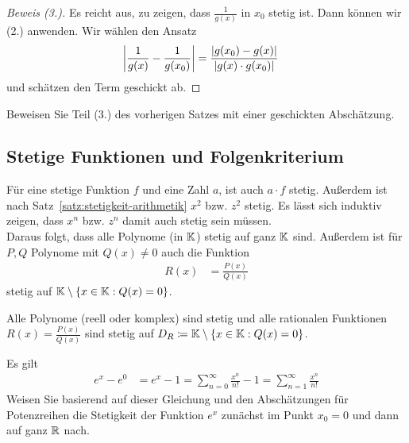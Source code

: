 \begin{satz}
    \begin{proof}[Beweis (3.)]
        Es reicht aus, zu zeigen, dass $\frac{1}{g(x)}$ in $x_0$ stetig ist. Dann können wir (2.) anwenden. Wir wählen den Ansatz
        \begin{align*}
            \left\lvert\frac{1}{g(x)} - \frac{1}{g(x_0)}\right\rvert &= \frac{\left\lvert g(x_0)-g(x)\right\rvert}{\left\lvert g(x)\cdot g(x_0)\right\rvert}
        \end{align*}
        und schätzen den Term geschickt ab.
    \end{proof}
    \begin{uebung}
        Beweisen Sie Teil (3.) des vorherigen Satzes mit einer geschickten Abschätzung.
    \end{uebung}
\end{satz}


\subsection{Stetige Funktionen und Folgenkriterium}

\begin{satz} %
    \marginnote{[23. Jan]}
    \label{stetigkeit:polynome}
    Für eine stetige Funktion $f$ und eine Zahl $a$, ist auch $a\cdot f$ stetig. Außerdem ist nach Satz~\ref{satz:stetigkeit-arithmetik} $x^2$ bzw. $z^2$ stetig. Es lässt sich induktiv zeigen, dass $x^n$ bzw. $z^n$ damit auch stetig sein müssen.\\
    Daraus folgt, dass alle Polynome (in $\mathbb{K}$) stetig auf ganz $\mathbb{K}$ sind. Außerdem ist für $P,Q$ Polynome mit $Q(x)\neq 0$ auch die Funktion
    \begin{align*}
        R(x) &= \frac{P(x)}{Q(x)}
    \end{align*}
    stetig auf $\mathbb{K}\setminus\left\{x\in\mathbb{K}: Q(x) = 0\right\}$.
\end{satz}

\begin{korollar} %
    Alle Polynome (reell oder komplex) sind stetig und alle rationalen Funktionen $R(x) = \frac{P(x)}{Q(x)}$ sind stetig auf $D_R \coloneqq \mathbb{K}\setminus\left\{x\in\mathbb{K}: Q(x) = 0\right\}$.
\end{korollar}

\begin{uebung}
    Es gilt
    \begin{align*}
        e^x-e^0 &= e^x - 1 = \sum_{n=0}^{\infty} \frac{x^n}{n!}-1 = \sum_{n=1}^{\infty} \frac{x^n}{n!}
    \end{align*}
    Weisen Sie basierend auf dieser Gleichung und den Abschätzungen für Potenzreihen die Stetigkeit der Funktion $e^x$ zunächst im Punkt $x_0 = 0$ und dann auf ganz $\mathbb{R}$ nach.
\end{uebung}

